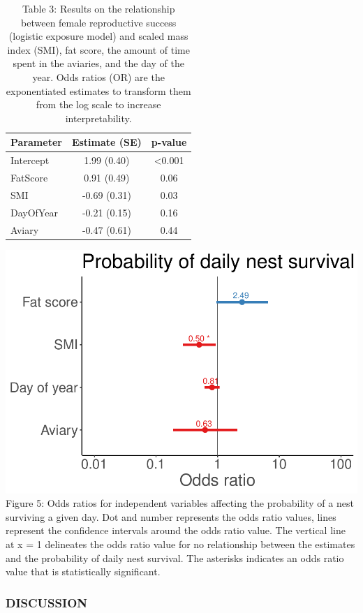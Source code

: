 \documentclass[
]{article}
\begin{document}
\begin{table}

\caption{\label{tab:logexp}Table 3: Results on the relationship between female reproductive success (logistic exposure model) and scaled mass index (SMI), fat score, the amount of time spent in the aviaries, and the day of the year. Odds ratios (OR) are the exponentiated estimates to transform them from the log scale to increase interpretability.}
\centering
\begin{tabular}[t]{l|c|c}
\hline
Parameter & Estimate (SE) & p-value\\
\hline
Intercept & 1.99 (0.40) & <0.001\\
\hline
FatScore & 0.91 (0.49) & 0.06\\
\hline
SMI & -0.69 (0.31) & 0.03\\
\hline
DayOfYear & -0.21 (0.15) & 0.16\\
\hline
Aviary & -0.47 (0.61) & 0.44\\
\hline
\end{tabular}
\end{table}

\includegraphics{gcondition_files/figure-latex/logexp-1.pdf} Figure 5:
Odds ratios for independent variables affecting the probability of a
nest surviving a given day. Dot and number represents the odds ratio
values, lines represent the confidence intervals around the odds ratio
value. The vertical line at x = 1 delineates the odds ratio value for no
relationship between the estimates and the probability of daily nest
survival. The asterisks indicates an odds ratio value that is
statistically significant.

\hypertarget{discussion}{%
\subsubsection{DISCUSSION}\label{discussion}}
\end{document}
